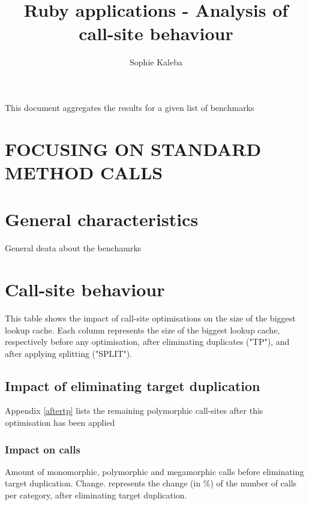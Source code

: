 \documentclass[10pt, sigplan, preprint]{acmart}
\begin{document}
\title{Ruby applications - Analysis of call-site behaviour}

\author{Sophie Kaleba}

\maketitle

This document aggregates the results for a given list of benchmarks

\section{FOCUSING ON STANDARD METHOD CALLS}

\section{General characteristics}

\begin{table}[!h]
	\caption{General deata about the benchamrks}
	\centering
	\tiny
	\Metrics
	\label{tab:metrics}
	\end{table}

\section{Call-site behaviour}

This table shows the impact of call-site optimisations on the size of the biggest lookup cache.
Each column represents the size of the biggest lookup cache, respectively before any optimisation, after eliminating duplicates ("TP"), and after applying splitting ("SPLIT").

\subsection{Impact of eliminating target duplication}

Appendix \ref{aftertp} lists the remaining polymorphic call-sites after this optimisation has been applied

\subsubsection{\textbf{Impact on calls}}

Amount of monomorphic, polymorphic and megamorphic calls before eliminating target duplication.
Change. represents the change (in \%) of the number of calls per category, after eliminating target duplication.
\end{document}
